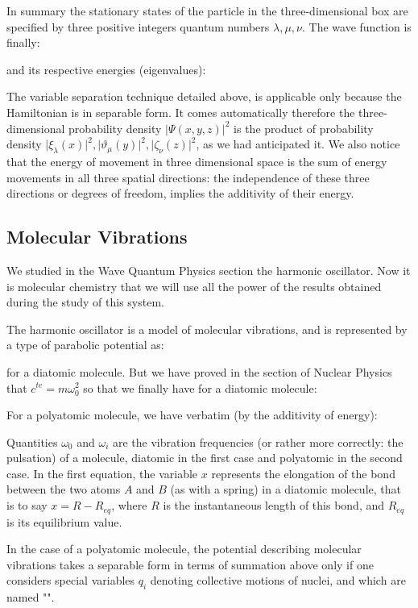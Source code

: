 	In summary the stationary states of the particle in the three-dimensional box are specified by three positive integers quantum numbers $\lambda, \mu, \nu$. The wave function is finally:
	
	and its respective energies (eigenvalues):
	
	The variable separation technique detailed above, is applicable only because the Hamiltonian is in separable form. It comes automatically therefore the three-dimensional probability density $\vert \Psi(x,y,z) \vert^2$ is the product of probability density $\vert \xi_\lambda(x)\vert^2,\vert \vartheta_\mu(y)\vert^2,\vert \zeta_\nu(z)\vert^2$, as we had anticipated it. We also notice that the energy of movement in three dimensional space is the sum of energy movements in all three spatial directions: the independence of these three directions or degrees of freedom, implies the additivity of their energy.
	
	\subsection{Molecular Vibrations}
	We studied in the Wave Quantum Physics section the harmonic oscillator. Now it is molecular chemistry that we will use all the power of the results obtained during the study of this system.
	
	The harmonic oscillator is a model of molecular vibrations, and is represented by a type of parabolic potential as:
	
	for a diatomic molecule. But we have proved in the section of Nuclear Physics that $c^{te}=m\omega_0^2$ so that we finally have for a diatomic molecule:
	
	For a polyatomic molecule, we have verbatim (by the additivity of energy):
	
	Quantities $\omega_0$ and $\omega_i$ are the vibration frequencies (or rather more correctly: the pulsation) of a molecule, diatomic in the first case and polyatomic in the second case. In the first equation, the variable $x$ represents the elongation of the bond between the two atoms $A$ and $B$ (as with a spring) in a diatomic molecule, that is to say $x=R-R_{eq}$, where $R$ is the instantaneous length of this bond, and $R_{eq}$ is its equilibrium value.
	
	In the case of a polyatomic molecule, the potential describing molecular vibrations takes a separable form in terms of summation above only if one considers special variables $q_i$ denoting collective motions of nuclei, and which are named "".
	
